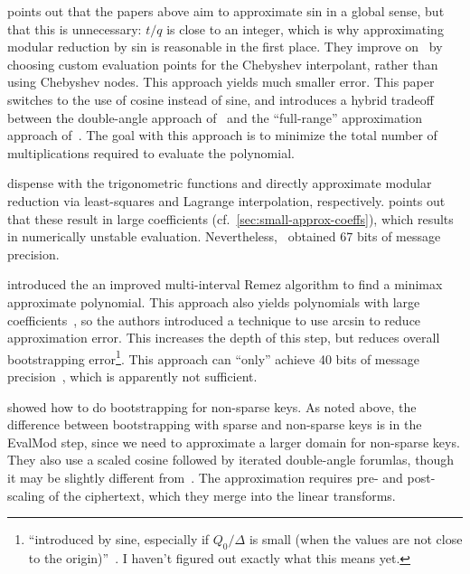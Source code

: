 \documentclass[../fheimpl.tex]{subfiles}
\begin{document}
    \cite{cryptoeprint:2019/688} points out that the papers above aim to approximate sin in a global sense, but that this is unnecessary: $t/q$ is close to an integer, which is why approximating modular reduction by sin is reasonable in the first place. They improve on~\cite{cryptoeprint:2018/1043} by choosing custom evaluation points for the Chebyshev interpolant, rather than using Chebyshev nodes. This approach yields much smaller error. This paper switches to the use of cosine instead of sine, and introduces a hybrid tradeoff between the double-angle approach of~\cite{cryptoeprint:2018/1043} and the ``full-range'' approximation approach of~\cite{cryptoeprint:2018/1043}. The goal with this approach is to minimize the total number of multiplications required to evaluate the polynomial.
    
    \cite{cryptoeprint:2020/488, cryptoeprint:2020/1355} dispense with the trigonometric functions and directly approximate modular reduction via least-squares and Lagrange interpolation, respectively. \cite{cryptoeprint:2020/1549} points out that these result in large coefficients (cf.~\cref{sec:small-approx-coeffs}), which results in numerically unstable evaluation. Nevertheless,~\cite{cryptoeprint:2020/1355} obtained 67 bits of message precision.
    
    \cite{cryptoeprint:2020/552} introduced the an improved multi-interval Remez algorithm to find a minimax approximate polynomial. This approach also yields polynomials with large coefficients~\cite{cryptoeprint:2021/572}, so the authors introduced a technique to use arcsin to reduce approximation error. This increases the depth of this step, but reduces overall bootstrapping error\footnote{``introduced by sine, especially if $Q_0/\Delta$ is small (when the values are not close to the origin)''~\cite{cryptoeprint:2020/1203}. I haven't figured out exactly what this means yet.}. This approach can ``only'' achieve 40 bits of message precision~\cite{cryptoeprint:2021/572}, which is apparently not sufficient.
    
    \cite{cryptoeprint:2020/1203} showed how to do bootstrapping for non-sparse keys. As noted above, the difference between bootstrapping with sparse and non-sparse keys is in the EvalMod step, since we need to approximate a larger domain for non-sparse keys. They also use a scaled cosine followed by iterated double-angle forumlas, though it may be slightly different from~\cite{cryptoeprint:2019/688}. The approximation requires pre- and post-scaling of the ciphertext, which they merge into the linear transforms.
    
\end{document}
